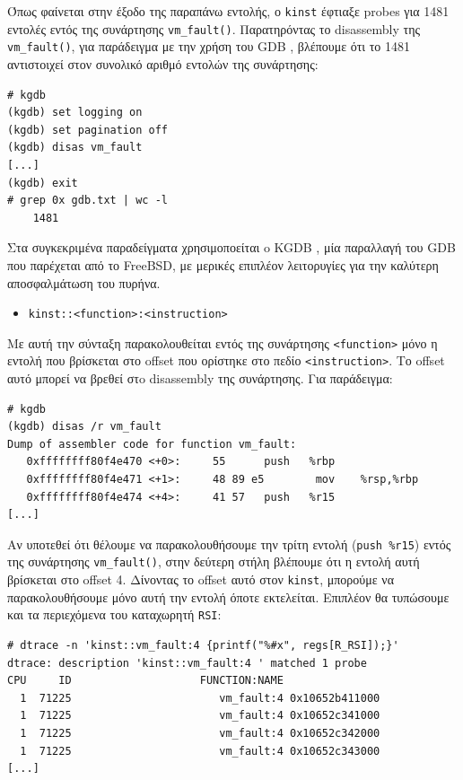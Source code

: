 \documentclass[12pt]{article}
\begin{document}
Όπως φαίνεται στην έξοδο της παραπάνω εντολής, ο \lstinline{kinst} έφτιαξε
probes για 1481 εντολές εντός της συνάρτησης \lstinline{vm_fault()}.
Παρατηρόντας το disassembly της \lstinline{vm_fault()}, για παράδειγμα με την
χρήση του GDB \cite{gdb}, βλέπουμε ότι το 1481 αντιστοιχεί στον συνολικό αριθμό
εντολών της συνάρτησης:

\begin{lstlisting}
# kgdb
(kgdb) set logging on
(kgdb) set pagination off
(kgdb) disas vm_fault
[...]
(kgdb) exit
# grep 0x gdb.txt | wc -l
    1481
\end{lstlisting}

Στα συγκεκριμένα παραδείγματα χρησιμοποείται o KGDB \cite{kgdb}, μία παραλλαγή
του GDB που παρέχεται από το FreeBSD, με μερικές επιπλέον λειτορυγίες για την
καλύτερη αποσφαλμάτωση του πυρήνα.

\begin{itemize}
	\item \lstinline{kinst::<function>:<instruction>}
\end{itemize}

Με αυτή την σύνταξη παρακολουθείται εντός της συνάρτησης \lstinline{<function>}
μόνο η εντολή που βρίσκεται στο offset που ορίστηκε στο πεδίο
\lstinline{<instruction>}. Το offset αυτό μπορεί να βρεθεί στo disassembly της
συνάρτησης. Για παράδειγμα:

\begin{lstlisting}
# kgdb
(kgdb) disas /r vm_fault
Dump of assembler code for function vm_fault:
   0xffffffff80f4e470 <+0>:     55      push   %rbp
   0xffffffff80f4e471 <+1>:     48 89 e5        mov    %rsp,%rbp
   0xffffffff80f4e474 <+4>:     41 57   push   %r15
[...]
\end{lstlisting}

Αν υποτεθεί ότι θέλουμε να παρακολουθήσουμε την τρίτη εντολή (\lstinline{push %r15})
εντός της συνάρτησης \lstinline{vm_fault()}, στην δεύτερη στήλη βλέπουμε ότι η
εντολή αυτή βρίσκεται στο offset 4. Δίνοντας το offset αυτό στον
\lstinline{kinst}, μπορούμε να παρακολουθήσουμε μόνο αυτή την εντολή όποτε
εκτελείται. Επιπλέον θα τυπώσουμε και τα περιεχόμενα του καταχωρητή
\lstinline{RSI}:

\begin{lstlisting}
# dtrace -n 'kinst::vm_fault:4 {printf("%#x", regs[R_RSI]);}'
dtrace: description 'kinst::vm_fault:4 ' matched 1 probe
CPU     ID                    FUNCTION:NAME
  1  71225                       vm_fault:4 0x10652b411000
  1  71225                       vm_fault:4 0x10652c341000
  1  71225                       vm_fault:4 0x10652c342000
  1  71225                       vm_fault:4 0x10652c343000
[...]
\end{lstlisting}
\end{document}
